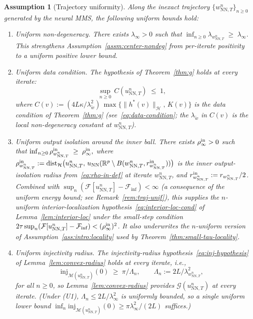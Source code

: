 \documentclass[twoside,11pt]{article}
\newtheorem{assumption}[theorem]{Assumption}
\newcommand{\R}{\mathbb{R}}
\newcommand{\NN}{\mathrm{NN}}
\newcommand{\calF}{\mathcal{F}}
\newcommand{\calG}{\mathcal{G}}
\newcommand{\calH}{\mathcal{H}}
\newcommand{\calM}{\mathcal{M}}
\newcommand{\dist}{\mathrm{dist}}
\begin{document}
\begin{assumption}[Trajectory uniformity]\label{assm:traj-unif}
Along the inexact trajectory $\{w^n_{\NN,T}\}_{n\ge 0}$ generated by the neural MMS, the following uniform bounds hold:
\begin{enumerate}[label=\textnormal{(U\arabic*)},leftmargin=*,nosep]
\item \emph{Uniform non-degeneracy.} There exists $\lambda_\infty>0$ such that
\(
\inf_{n\ge 0}\lambda_{w^n_{\NN,T}}\;\ge\;\lambda_\infty.
\)
This strengthens Assumption~\ref{assm:center-nondeg} from per-iterate positivity to a uniform positive lower bound.
\item \emph{Uniform data condition.} The hypothesis of Theorem~\ref{thm:g} holds at every iterate:
\[
\sup_{n\ge 0}\,C(u^n_{\NN,T})\;\le\;1,
\]
where $C(v):=(4L\kappa/\lambda_{\tilde w}^{2})\,\max\{\|h^*(v)\|_\calH,\,K(v)\}$ is the data condition of Theorem~\ref{thm:g} (see~\eqref{eq:data-condition}; the $\lambda_{\tilde w}$ in $C(v)$ is the local non-degeneracy constant at $w^n_{\NN,T}$).
\item \emph{Uniform output isolation around the inner ball.} There exists $\rho^{\rm in}_\infty>0$ such that
\(
\inf_{n\ge 0}\rho^{\rm in}_{w^n_{\NN,T}}\;\ge\;\rho^{\rm in}_\infty,
\)
where $\rho^{\rm in}_{w^n_{\NN,T}}:=\dist_\calH\bigl(u^n_{\NN,T},\,u_\NN(\R^p\setminus B(w^n_{\NN,T},r^{\rm in}_{w^n_{\NN,T}}))\bigr)$ is the inner output-isolation radius from~\eqref{eq:rho-in-def} at iterate $w^n_{\NN,T}$, and $r^{\rm in}_{w^n_{\NN,T}} := r_{w^n_{\NN,T}}/2$. Combined with $\sup_n(\calF[u^n_{\NN,T}]-\calF_{\inf})<\infty$ (a consequence of the uniform energy bound; see Remark~\ref{rem:traj-unif}), this supplies the $n$-uniform interior-localization hypothesis~\eqref{eq:interior-loc-cond} of Lemma~\ref{lem:interior-loc} under the small-step condition $2\tau\sup_n(\calF[u^n_{\NN,T}]-\calF_{\inf}) < (\rho^{\rm in}_\infty)^2$. It also underwrites the $n$-uniform version of Assumption~\ref{ass:intro:locality} used by Theorem~\ref{thm:small-tau-locality}.
\item \emph{Uniform injectivity radius.} The injectivity-radius hypothesis~\eqref{eq:inj-hypothesis} of Lemma~\ref{lem:convex-radius} holds at every iterate, i.e.,
\[
\mathrm{inj}_{\calM(u^n_{\NN,T})}(0)\;\ge\;\pi/\Lambda_n,\qquad \Lambda_n:=2L/\lambda_{w^n_{\NN,T}}^2,
\]
for all $n\ge 0$, so Lemma~\ref{lem:convex-radius} provides $\calG(u^n_{\NN,T})$ at every iterate. (Under (U1), $\Lambda_n\le 2L/\lambda_\infty^2$ is uniformly bounded, so a single uniform lower bound $\inf_n \mathrm{inj}_{\calM(u^n_{\NN,T})}(0)\ge \pi\lambda_\infty^2/(2L)$ suffices.)
\end{enumerate}
\end{assumption}
\end{document}
